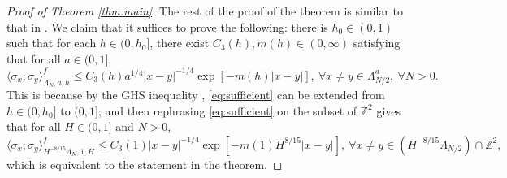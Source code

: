 \documentclass[article,12pt,reqno]{amsart}
\begin{document}
\begin{proof}[Proof of Theorem \ref{thm:main}]


     
	The rest of the proof of the theorem is similar to that in \cite{CJN20a}. We claim that it suffices to prove the following: there is $h_0\in(0,1)$ such that for each $h\in(0,h_0]$, there exist $C_3(h),m(h)\in(0,\infty)$ satisfying that for all $a\in(0,1]$,
	\begin{equation}\label{eq:sufficient}
		\langle \sigma_x; \sigma_y \rangle_{\Lambda_N,a,h}^f \leq C_3(h)a^{1/4}|x-y|^{-1/4}\exp[-m(h)|x-y|],~\forall x\neq y\in \Lambda_{N/2}^a,~\forall N>0.
	\end{equation}
	This is because by the GHS inequality \cite{GHS70}, \eqref{eq:sufficient} can be extended from $h\in(0,h_0]$ to $(0,1]$; and then rephrasing \eqref{eq:sufficient} on the subset of $\mathbb{Z}^2$ gives that for all $H\in(0,1]$ and $N>0$,
	\[	\langle \sigma_x; \sigma_y \rangle_{H^{-8/15}\Lambda_N,1,H}^f \leq C_3(1)|x-y|^{-1/4}\exp[-m(1)H^{8/15}|x-y|],~\forall x\neq y\in (H^{-8/15}\Lambda_{N/2}) \cap \mathbb{Z}^2,\]
	which is equivalent to the statement in the theorem.


\end{proof}
\end{document}
